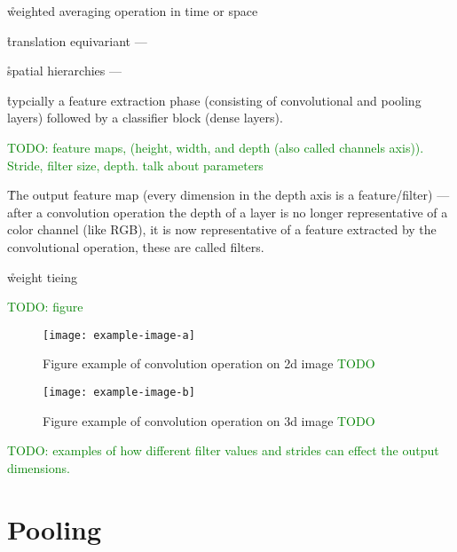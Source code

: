 

\r{weighted averaging operation in time or space}


\r{translation equivariant --- }


\r{spatial hierarchies --- }


\r{typcially a feature extraction phase (consisting of convolutional and pooling layers) followed by a classifier block (dense layers).}

\textcolor{green}{TODO: feature maps, (height, width, and depth (also called channels axis)). Stride, filter size, depth. talk about parameters}

\r{The output feature map (every dimension in the depth axis is a feature/filter) --- after a convolution operation the depth of a layer is no longer representative of a color channel (like RGB), it is now representative of a feature extracted by the convolutional operation, these are called filters.}



\r{weight tieing}


\textcolor{green}{TODO: figure}

\begin{figure}[htp]
	\centering
	\texttt{[image: example-image-a]}\hfil
	\caption{Figure example of convolution operation on 2d image \textcolor{green}{TODO}}
	\label{fig:conv_2d_example_calc}
\end{figure}

\begin{figure}[htp]
	\centering
	\texttt{[image: example-image-b]}\hfil
	\caption{Figure example of convolution operation on 3d image \textcolor{green}{TODO}}
	\label{fig:conv_2d_depth_example_calc}
\end{figure}

\textcolor{green}{TODO: examples of how different filter values and strides can effect the output dimensions.}




\section{Pooling}

